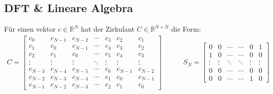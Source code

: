\newpage
\subsection{DFT \& Lineare Algebra}

\setcounter{all}{25}
 Für einen vektor $c \in \mathbb{R}^N$ hat der Zirkulant $C \in \mathbb{R}^{N \times N}$ die Form:
\begin{align*}
    C = \begin{bmatrix}
        c_0 & c_{N-1} & c_{N-2} & \cdots & c_3 & c_2 & c_1 \\
        c_1 & c_0     & c_{N-1} & \cdots & c_4 & c_3 & c_2 \\
        c_2 & c_1     & c_{0}   & \cdots & c_5 & c_4 & c_3 \\
        \vdots & \vdots & \vdots & \ddots & \vdots & \vdots & \vdots \\
        c_{N-3} & c_{N-4} & c_{N-5} & \cdots & c_0 & c_{N-1} & c_{N-2} \\
        c_{N-2} & c_{N-3} & c_{N-4} & \cdots & c_{1} & c_0 & c_{N-1} \\
        c_{N-1} & c_{N-2} & c_{N-3} & \cdots & c_{2} & c_1 & c_0
    \end{bmatrix}
    \quad \quad \quad 
    S_N = \begin{bmatrix}
        0 & 0 & \cdots & \cdots & 0 & 1 \\
        1 & 0 & \cdots & \cdots & 0 & 0 \\
        \vdots & \vdots & \ddots & \ddots & \vdots & \vdots \\
        0 & 0 & \cdots & \cdots & 0 & 0 \\
        0 & 0 & \cdots & \cdots & 1 & 0 
    \end{bmatrix}
\end{align*}

